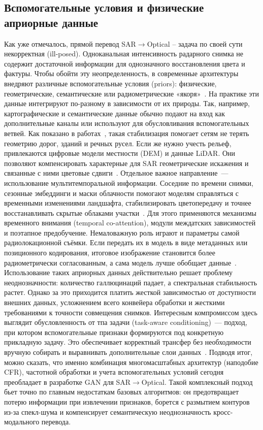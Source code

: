 \subsection{Вспомогательные условия и физические априорные данные}
\label{subsec:priors_sar2opt}

Как уже отмечалось, прямой перевод SAR$\to$Optical -- задача по своей сути некорректная (ill-posed).
Одноканальная интенсивность радарного снимка не содержит достаточной информации для однозначного восстановления цвета и фактуры.
Чтобы обойти эту неопределенность, в современные архитектуры внедряют различные вспомогательные условия (priors): физические, геометрические, семантические или радиометрические «якоря»~\cite{wang2025generative}. 
На практике эти данные интегрируют по-разному в зависимости от их природы.
Так, например, картографические и семантические данные обычно подают на вход как дополнительные каналы или используют для обусловливания вспомогательных ветвей.
Как показано в работах~\cite{cabrera2021sar, fu2024advanced, guo2024scene}, такая стабилизация помогает сетям не терять геометрию дорог, зданий и речных русел.
Если же нужно учесть рельеф, привлекаются цифровые модели местности (DEM) и данные LiDAR.
Они позволяют компенсировать характерные для SAR геометрические искажения и связанные с ними цветовые сдвиги~\cite{bralet2024dem, zhang2024interpretable}.
Отдельное важное направление~--- использование мультитемпоральной информации.
Соседние по времени снимки, сезонные эмбеддинги и маски облачности помогают моделям справляться с временными изменениями ландшафта, стабилизировать цветопередачу и точнее восстанавливать скрытые облаками участки~\cite{kwak2024assessing, liu2022modality, wang2025generative}.
Для этого применяются механизмы временного внимания (temporal co-attention), модули междатских зависимостей и поэтапное предобучение.
Немаловажную роль играют и параметры самой радиолокационной съёмки.
Если передать их в модель в виде метаданных или позиционного кодирования, итоговое изображение становится более радиометрически согласованным, а сама модель лучше обобщает данные~\cite{wang2025generative}.
Использование таких априорных данных действительно решает проблему неоднозначности: количество галлюцинаций падает, а спектральная стабильность растет.
Однако за это приходится платить жесткой зависимостью от доступности внешних данных, усложнением всего конвейера обработки и жесткими требованиями к точности совмещения снимков.
Интересным компромиссом здесь выглядит обусловленность от тпа задачи (task-aware conditioning)~--- подход, при котором вспомогательные признаки формируются под конкретную прикладную задачу.
Это обеспечивает корректный трансфер без необходимости вручную собирать и выравнивать дополнительные слои данных~\cite{wang2025generative, zhang2024seg}.
Подводя итог, можно сказать, что именно комбинация многомасштабных архитектур (наподобие CFR), частотной обработки и учета вспомогательных условий сегодня преобладает в разработке GAN для SAR$\to$Optical.
Такой комплексный подход бьет точно по главным недостаткам базовых алгоритмов: он предотвращает потерю информации при извлечении признаков, борется с размытием контуров из-за спекл-шума и компенсирует семантическую неоднозначность кросс-модального перевода.

